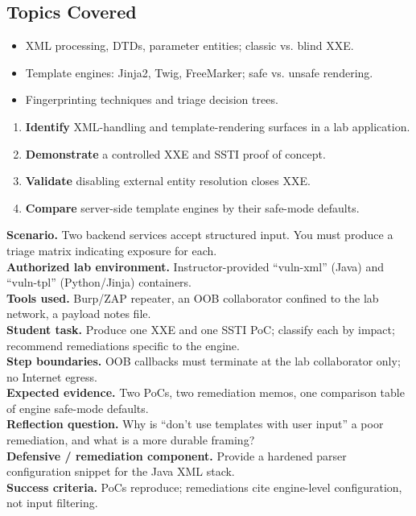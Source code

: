 \documentclass[11pt,letterpaper,oneside]{report}
\begin{document}
\subsection*{Topics Covered}
\begin{itemize}
  \item XML processing, DTDs, parameter entities; classic vs. blind XXE.
  \item Template engines: Jinja2, Twig, FreeMarker; safe vs. unsafe rendering.
  \item Fingerprinting techniques and triage decision trees.
\end{itemize}

\begin{outcomes}
\begin{enumerate}
  \item \textbf{Identify} XML-handling and template-rendering surfaces in a lab application.
  \item \textbf{Demonstrate} a controlled XXE and SSTI proof of concept.
  \item \textbf{Validate} disabling external entity resolution closes XXE.
  \item \textbf{Compare} server-side template engines by their safe-mode defaults.
\end{enumerate}
\end{outcomes}

\begin{labbox}
\textbf{Scenario.} Two backend services accept structured input. You must produce a triage matrix indicating exposure for each.\\[3pt]
\textbf{Authorized lab environment.} Instructor-provided ``vuln-xml'' (Java) and ``vuln-tpl'' (Python/Jinja) containers.\\[3pt]
\textbf{Tools used.} Burp/ZAP repeater, an OOB collaborator confined to the lab network, a payload notes file.\\[3pt]
\textbf{Student task.} Produce one XXE and one SSTI PoC; classify each by impact; recommend remediations specific to the engine.\\[3pt]
\textbf{Step boundaries.} OOB callbacks must terminate at the lab collaborator only; no Internet egress.\\[3pt]
\textbf{Expected evidence.} Two PoCs, two remediation memos, one comparison table of engine safe-mode defaults.\\[3pt]
\textbf{Reflection question.} Why is ``don't use templates with user input'' a poor remediation, and what is a more durable framing?\\[3pt]
\textbf{Defensive / remediation component.} Provide a hardened parser configuration snippet for the Java XML stack.\\[3pt]
\textbf{Success criteria.} PoCs reproduce; remediations cite engine-level configuration, not input filtering.
\end{labbox}
\end{document}
